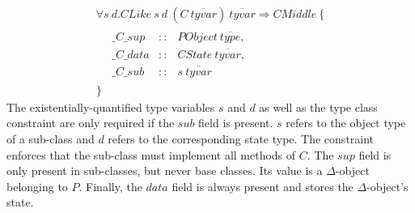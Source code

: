 \documentclass[authoryear,preprint]{sigplanconf}
\begin{document}
\begin{displaymath}
\begin{array}{l}
\forall s~d.\mathit{CLike}~s~d~(\mathit{C}~\overline{\mathit{tyvar}})~\overline{\mathit{tyvar}} \Rightarrow \mathit{CMiddle}~\{\\
\quad \begin{array}{lcl}
\_\mathit{C}\_\mathit{sup}  & :: & \mathit{PObject}~\overline{\mathit{type}}, \\
\_\mathit{C}\_\mathit{data} & :: & \mathit{CState}~\overline{\mathit{tyvar}}, \\
\_\mathit{C}\_\mathit{sub}  & :: & s~\overline{\mathit{tyvar}}
\end{array}\\
\}
\end{array}
\end{displaymath}
The existentially-quantified type variables $s$ and $d$ as well as the type class constraint are only required if the $\mathit{sub}$ field is present. $s$ refers to the object type of a sub-class and $d$ refers to the corresponding state type. The constraint enforces that the sub-class must implement all methods of $C$. The $\mathit{sup}$ field is only present in sub-classes, but never base classes. Its value is a $\Delta$-object belonging to $P$. Finally, the $\mathit{data}$ field is always present and stores the $\Delta$-object's state.
\end{document}
